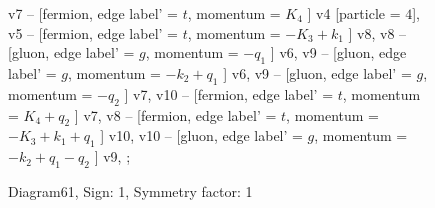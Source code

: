 \documentclass{revtex4}
\begin{document}
\begin{figure}[!htb]
\begin{center}
{v7 -- [fermion, edge label' = \(t\), momentum = \(K_{4}\) ] v4 [particle = \(4\)], 
v5 -- [fermion, edge label' = \(t\), momentum = \(-K_{3} + k_{1}\) ] v8, 
v8 -- [gluon, edge label' = \(g\), momentum = \(-q_{1}\) ] v6, 
v9 -- [gluon, edge label' = \(g\), momentum = \(-k_{2} + q_{1}\) ] v6, 
v9 -- [gluon, edge label' = \(g\), momentum = \(-q_{2}\) ] v7, 
v10 -- [fermion, edge label' = \(t\), momentum = \(K_{4} + q_{2}\) ] v7, 
v8 -- [fermion, edge label' = \(t\), momentum = \(-K_{3} + k_{1} + q_{1}\) ] v10, 
v10 -- [gluon, edge label' = \(g\), momentum = \(-k_{2} + q_{1} - q_{2}\) ] v9, 
};
\end{center}
\caption{Diagram61, Sign: 1, Symmetry factor: 1}
\end{figure}
\newpage
\end{document}
